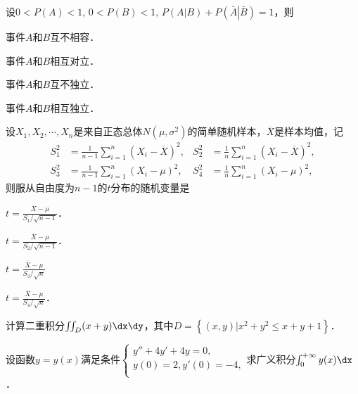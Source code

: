 \documentclass[plain,noanswer,medmath]{../../template/jnuexam}
\begin{document}
\begin{problem}
设$0 < P(A) < 1$, $0 < P(B) < 1$, $P(\left. A \right|B) + P(\left. \bar A \right|\bar B) = 1$，则\pickout{}
\begin{abcd}
\item 事件$A$和$B$互不相容．          
\item 事件$A$和$B$相互对立．
\item 事件$A$和$B$互不独立．          
\item 事件$A$和$B$相互独立．
\end{abcd}
\end{problem}


\begin{problem}
设$X_1,X_2, \cdots ,X_n$是来自正态总体$N(\mu ,\sigma^2)$的简单随机样本，$\overline{X}$是样本均值，记
\begin{align*}
  S_1^2&= \frac{1}{n - 1}\sum_{i = 1}^n (X_i - \overline{X})^2, &
  S_2^2&= \frac{1}{n}\sum_{i = 1}^n (X_i - \overline{X})^2, \\
  S_3^2&= \frac{1}{n - 1}\sum_{i = 1}^n (X_i - \mu)^2, &
  S_4^2&= \frac{1}{n}\sum_{i = 1}^n (X_i - \mu)^2,
\end{align*}
则服从自由度为$n - 1$的$t$分布的随机变量是\pickout{}
\begin{abcd}
\item $t = \frac{\overline{X}- \mu}{S_1/\sqrt{n - 1}}$．					
\item $t = \frac{\overline{X}- \mu}{S_2/\sqrt{n - 1}}$．
\item $t = \frac{\overline{X}- \mu}{S_3/\sqrt{n}}$							
\item $t = \frac{\overline{X}- \mu}{S_4/\sqrt{n}}$．
\end{abcd}
\end{problem}



\begin{problem}
计算二重积分$\iint_D (x + y)\dx\dy$，其中$D = \left\{\left. (x,y) \right| x^2 + y^2 \le x + y + 1 \right\}$．
\end{problem}



\begin{problem}
设函数$y = y(x)$满足条件$\begin{cases}
 y'' + 4y' + 4y = 0, \\
 y(0) = 2,y'(0) = - 4, \\
\end{cases}$求广义积分$\int_0^{+\infty} y(x)\dx$．
\end{problem}
\end{document}
